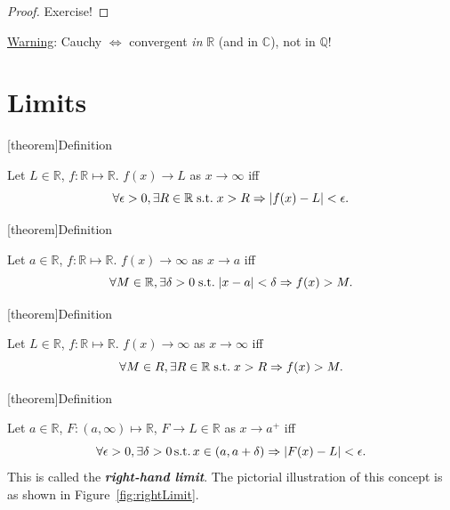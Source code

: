 \documentclass[12pt]{report}
\theoremstyle{definition}
\begin{document}
\begin{proof}
    Exercise!
\end{proof}

\underline{Warning}: Cauchy $\iff$ convergent \emph{in} $\mathbb{R}$ 
(and in $\mathbb{C}$), not in $\mathbb{Q}$!

\section{Limits}

[theorem]{Definition}
\begin{f tends to L as x tends to infinity}
    Let $L \in \mathbb{R}$, $f:\mathbb{R}\mapsto\mathbb{R}$. 
    $f(x)\rightarrow{}L$ as $x \rightarrow{}\infty$ iff\[
        \forall \epsilon > 0, \exists R\in \mathbb{R} 
        \;\textnormal{s.t.}\;x>R\Rightarrow{}
        |f(x)-L|<\epsilon.
    \]
\end{f tends to L as x tends to infinity}

[theorem]{Definition}
\begin{f tends to infinity as x tends to a}
    Let $a \in \mathbb{R}$, $f:\mathbb{R}\mapsto\mathbb{R}$. 
    $f(x)\rightarrow{}\infty$ as $x\rightarrow{}a$ iff\[
        \forall M\in\mathbb{R}, \exists \delta>0 \;\textnormal{s.t.}\;
        |x-a|<\delta \Rightarrow{}f(x)>M.
    \]
\end{f tends to infinity as x tends to a}

[theorem]{Definition}
\begin{f tends to infinity as x tends to infinity}
    Let $L \in \mathbb{R}$, $f:\mathbb{R}\mapsto\mathbb{R}$. 
    $f(x) \rightarrow{} \infty$ as $x\rightarrow{}\infty$ iff\[
        \forall M \in R, \exists R\in\mathbb{R}\;\textnormal{s.t.}\;x>R\Rightarrow{}f(x)>M.
    \]
\end{f tends to infinity as x tends to infinity}

[theorem]{Definition}
\begin{right limit}
    Let $a \in \mathbb{R}$, $F: (a, \infty) \mapsto \mathbb{R}$, $F \rightarrow{}L \in \mathbb{R}$
    as $x \rightarrow{}a^{+}$ iff\[
        \forall \epsilon > 0, \exists \delta > 0 \,\textnormal{s.t.}\,
        x \in (a, a + \delta) \Rightarrow{}|F(x) - L| < \epsilon.
    \]
    This is called the \textbf{\emph{right-hand limit}}.
    The pictorial illustration of this concept is as shown in Figure~\ref{fig:rightLimit}.
\end{right limit}
\end{document}
